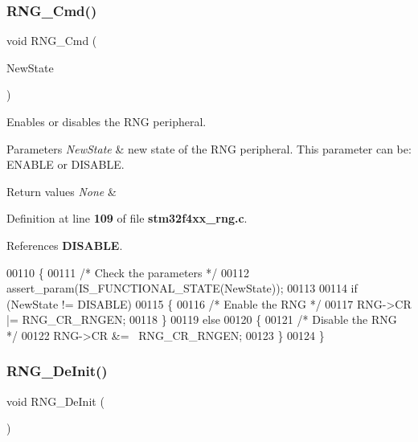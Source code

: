 \subsubsection{R\+N\+G\+\_\+\+Cmd()}
{\footnotesize\ttfamily void R\+N\+G\+\_\+\+Cmd (\begin{DoxyParamCaption}\item[{\textbf{ Functional\+State}}]{New\+State }\end{DoxyParamCaption})}



Enables or disables the R\+NG peripheral. 


\begin{DoxyParams}{Parameters}
{\em New\+State} & new state of the R\+NG peripheral. This parameter can be\+: E\+N\+A\+B\+LE or D\+I\+S\+A\+B\+LE. \\
\hline
\end{DoxyParams}

\begin{DoxyRetVals}{Return values}
{\em None} & \\
\hline
\end{DoxyRetVals}


Definition at line \textbf{ 109} of file \textbf{ stm32f4xx\+\_\+rng.\+c}.



References \textbf{ D\+I\+S\+A\+B\+LE}.


\begin{DoxyCode}
00110 \{
00111   \textcolor{comment}{/* Check the parameters */}
00112   assert_param(IS_FUNCTIONAL_STATE(NewState));
00113 
00114   \textcolor{keywordflow}{if} (NewState != DISABLE)
00115   \{
00116     \textcolor{comment}{/* Enable the RNG */}
00117     RNG->CR |= RNG_CR_RNGEN;
00118   \}
00119   \textcolor{keywordflow}{else}
00120   \{
00121     \textcolor{comment}{/* Disable the RNG */}
00122     RNG->CR &= ~RNG_CR_RNGEN;
00123   \}
00124 \}
\end{DoxyCode}
\mbox{\label{group__RNG__Group1_ga15ff5e649080076eebd51143b9ac4491}} 
\subsubsection{R\+N\+G\+\_\+\+De\+Init()}
{\footnotesize\ttfamily void R\+N\+G\+\_\+\+De\+Init (\begin{DoxyParamCaption}\item[{void}]{ }\end{DoxyParamCaption})}



